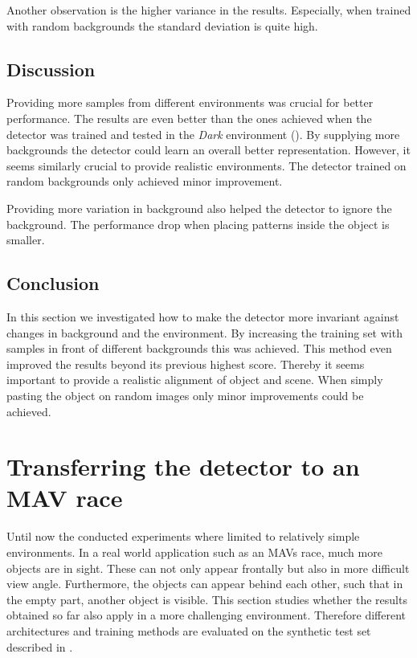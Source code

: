 Another observation is the higher variance in the results. Especially, when trained with random backgrounds the standard deviation is quite high. 


\subsection{Discussion}

Providing more samples from different environments was crucial for better performance. The results are even better than the ones achieved when the detector was trained and tested in the \textit{Dark} environment (). By supplying more backgrounds the detector could learn an overall better representation. However, it seems similarly crucial to provide realistic environments. The detector trained on random backgrounds only achieved minor improvement.

Providing more variation in background also helped the detector to ignore the background. The performance drop when placing patterns inside the object is smaller.

\subsection{Conclusion}

In this section we investigated how to make the detector more invariant against changes in background and the environment. By increasing the training set with samples in front of different backgrounds this was achieved. This method even improved the results beyond its previous highest score. Thereby it seems important to provide a realistic alignment of object and scene. When simply pasting the object on random images only minor improvements could be achieved.

\section{Transferring the detector to an \ac{MAV} race}

Until now the conducted experiments where limited to relatively simple environments. In a real world application such as an \acp{MAV} race, much more objects are in sight. These can not only appear frontally but also in more difficult view angle. Furthermore, the objects can appear behind each other, such that in the empty part, another object is visible. This section studies whether the results obtained so far also apply in a more challenging environment. Therefore different architectures and training methods are evaluated on the synthetic test set described in .


